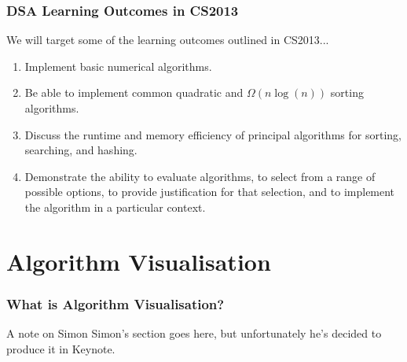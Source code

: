 \documentclass{beamer}
\begin{document}
\begin{frame}
  \frametitle{DSA Learning Outcomes in CS2013}
  We will target some of the learning outcomes outlined in CS2013...
  \begin{enumerate}
    \item Implement basic numerical algorithms.
    \item Be able to implement common quadratic and $\Omega(n\log(n))$ sorting algorithms.
    \item Discuss the runtime and memory efficiency of principal algorithms for sorting, searching, and hashing.
    \item Demonstrate the ability to evaluate algorithms, to select from a range of possible options, to provide justification for that selection, and to implement the algorithm in a particular context. 
  \end{enumerate}
\end{frame}
\section{Algorithm Visualisation}
\begin{frame}
  \frametitle{What is Algorithm Visualisation?}
  \begin{block}{A note on Simon}
    Simon's section goes here, but unfortunately he's decided to produce it in Keynote.
  \end{block}
\end{frame}
\end{document}
